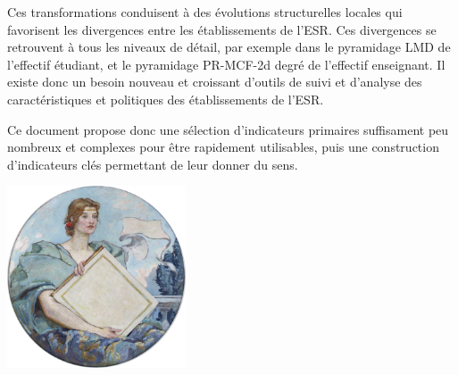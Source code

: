 \documentclass[11pt,french,landscape]{article}
\begin{document}
Ces transformations conduisent à des évolutions structurelles locales
qui favorisent les divergences entre les établissements de l'ESR. Ces
divergences se retrouvent à tous les niveaux de détail, par exemple dans
le pyramidage LMD de l'effectif étudiant, et le pyramidage PR-MCF-2d
degré de l'effectif enseignant. Il existe donc un besoin nouveau et
croissant d'outils de suivi et d'analyse des caractéristiques et
politiques des établissements de l'ESR.

Ce document propose donc une sélection d'indicateurs primaires
suffisament peu nombreux et complexes pour être rapidement utilisables,
puis une construction d'indicateurs clés permettant de leur donner du
sens.

\vspace*{\fill}

\begin{center}\includegraphics[width=200px,height=0.3\textheight]{files/589px-Knowledge-Reid-Highsmith} \end{center}
\end{document}

